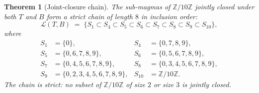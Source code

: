 \documentclass[11pt,reqno]{amsart}
\theoremstyle{plain}
\newtheorem{theorem}{Theorem}
\theoremstyle{definition}
\theoremstyle{remark}
\newcommand{\Z}{\mathbb{Z}}
\newcommand{\Zten}{\Z/10\Z}
\begin{document}
\begin{theorem}[Joint-closure chain]\label{thm:chain}
The sub-magmas of $\Zten$ jointly closed under both $T$ and $B$
form a strict chain of length $8$ in inclusion order:
\[
\mathcal{L}(T,B)\;=\;\bigl\{S_{1}\subset S_{4}\subset S_{5}\subset
S_{6}\subset S_{7}\subset S_{8}\subset S_{9}\subset S_{10}\bigr\},
\]
where
\begin{align*}
S_{1}&=\{0\}, & S_{4}&=\{0,7,8,9\}, \\
S_{5}&=\{0,6,7,8,9\}, & S_{6}&=\{0,5,6,7,8,9\}, \\
S_{7}&=\{0,4,5,6,7,8,9\}, & S_{8}&=\{0,3,4,5,6,7,8,9\}, \\
S_{9}&=\{0,2,3,4,5,6,7,8,9\}, & S_{10}&=\Zten.
\end{align*}
The chain is strict: no subset of $\Zten$ of size $2$ or size $3$
is jointly closed.
\end{theorem}
\end{document}
